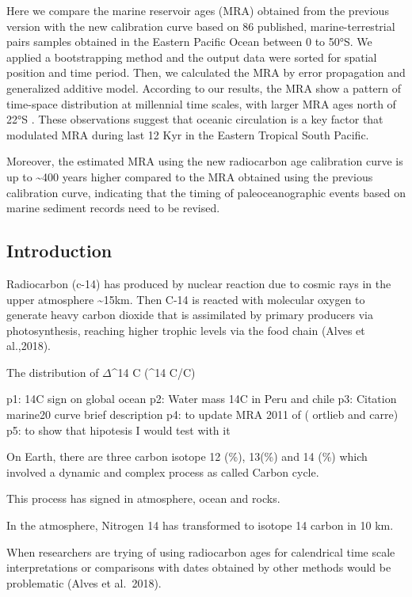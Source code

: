 \documentclass[
]{article}
\begin{document}
Here we compare the marine reservoir ages (MRA) obtained from the
previous version with the new calibration curve based on 86 published,
marine-terrestrial pairs samples obtained in the Eastern Pacific Ocean
between 0 to 50°S. We applied a bootstrapping method and the output data
were sorted for spatial position and time period. Then, we calculated
the MRA by error propagation and generalized additive model. According
to our results, the MRA show a pattern of time-space distribution at
millennial time scales, with larger MRA ages north of 22°S . These
observations suggest that oceanic circulation is a key factor that
modulated MRA during last 12 Kyr in the Eastern Tropical South Pacific.

Moreover, the estimated MRA using the new radiocarbon age calibration
curve is up to \textasciitilde400 years higher compared to the MRA
obtained using the previous calibration curve, indicating that the
timing of paleoceanographic events based on marine sediment records need
to be revised.

\hypertarget{introduction}{%
\subsection{Introduction}\label{introduction}}

Radiocarbon (c-14) has produced by nuclear reaction due to cosmic rays
in the upper atmosphere \textasciitilde15km. Then C-14 is reacted with
molecular oxygen to generate heavy carbon dioxide that is assimilated by
primary producers via photosynthesis, reaching higher trophic levels via
the food chain (Alves et al.,2018).

The distribution of \(\Delta\)\^{}14 C (\^{}14 C/C)

p1: 14C sign on global ocean p2: Water mass 14C in Peru and chile p3:
Citation marine20 curve brief description p4: to update MRA 2011 of (
ortlieb and carre) p5: to show that hipotesis I would test with it

On Earth, there are three carbon isotope 12 (\%), 13(\%) and 14 (\%)
which involved a dynamic and complex process as called Carbon cycle.

This process has signed in atmosphere, ocean and rocks.

In the atmosphere, Nitrogen 14 has transformed to isotope 14 carbon in
10 km.

When researchers are trying of using radiocarbon ages for calendrical
time scale interpretations or comparisons with dates obtained by other
methods would be problematic (Alves et al.~2018).
\end{document}
